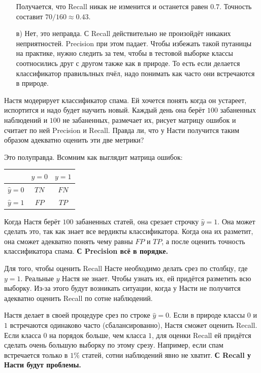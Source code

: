 \documentclass[12pt, a4paper, oneside]{article}
\theoremstyle{plain} %
\theoremstyle{definition}
\newcounter{problem}%
\renewcommand{\theproblem}{\arabic{problem}}
\newenvironment{problem}{
\addtocounter{problem}{1}\noindent{ \color{titleblue} \large \bfseries Упражнение~\theproblem \vspace{1ex} \newline}
}{ }
\newcommand{\indef}[1]{\textbf{ \color{green} #1}}
\begin{document}
\begin{solution}
\begin{enumerate}
Получается, что Recall никак не изменится и останется равен $0.7$. Точность составит $70/160 \approx 0.43$.

\item[в)] Нет, это неправда. С Recall действительно не произойдёт никаких неприятностей. Precision при этом падает. Чтобы избежать такой путаницы на практике, нужно следить за тем, чтобы в тестовой выборке классы соотносились друг с другом также как в природе. То есть если делается классификатор правильлных пчёл, надо понимать как часто они встречаются в природе. 
\end{enumerate} 
\end{solution}

\begin{problem} 
Настя модерирует классификатор спама. Ей хочется понять когда он устареет, испортится и надо будет научить новый. Каждый день она берёт $100$ забаненных наблюдений и $100$ не забаненных, размечает их, рисует матрицу ошибок и считает по ней Precision и Recall. Правда ли, что у Насти получится таким образом адекватно оценить эти две метрики? 
\end{problem} 

\begin{solution}
Это полуправда. Всомним как выглядит матрица ошибок: 

\begin{center}
	\begin{tabular}{|c|c|c|}
		\hline
		& $y=0$  &  $ y = 1$ \\  \hline 
		$\hat y = 0$ & $TN$ & $FN$ \\ \hline 
		$\hat y = 1$ & $FP$ & $TP$ \\ \hline
	\end{tabular}
\end{center}

Когда Настя берёт $100$ забаненных статей, она срезает строчку $\hat y = 1$. Она может сделать это, так как знает все вердикты классификатора. Когда она их разметит, она сможет адекватно понять чему равны $FP$ и $TP$, а после оценить точность классификатора спама. \indef{С Precision всё в порядке.} 

Для того, чтобы оценить Recall Насте необходимо делать срез по столбцу, где $y=1$. Реальные $y$ Настя не знает. Чтобы узнать их, ей придётся разметить всю выборку. Из-за этого будут возникать ситуации, когда у Насти не получится адекватно оценить Recall по сотне наблюдений. 

Настя делает в своей процедуре срез по строке $\hat y = 0$. Если в природе классы $0$ и $1$ встречаются одинаково часто (сбалансированно), Настя сможет оценить Recall. Если класса $0$ на порядок больше, чем класса $1$, для оценки Recall ей придётся сделать очень большую выборку по этому срезу. Например, если спам встречается только в $1\%$ статей, сотни наблюдений явно не хватит. \indef{С Recall у Насти будут проблемы.}  
\end{solution}
\end{document}
